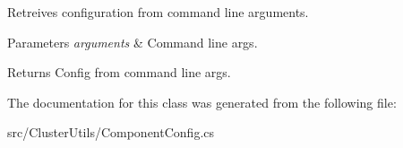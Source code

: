 Retreives configuration from command line arguments. 


\begin{DoxyParams}{Parameters}
{\em arguments} & Command line args.\\
\hline
\end{DoxyParams}
\begin{DoxyReturn}{Returns}
Config from command line args.
\end{DoxyReturn}


The documentation for this class was generated from the following file\+:\begin{DoxyCompactItemize}
\item 
src/\+Cluster\+Utils/Component\+Config.\+cs\end{DoxyCompactItemize}
